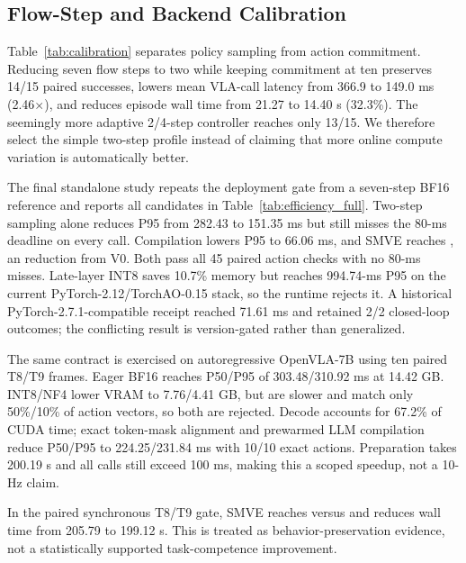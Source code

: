 \documentclass[runningheads]{waica}
\begin{document}
\subsection{Flow-Step and Backend Calibration}

Table~\ref{tab:calibration} separates policy sampling from action commitment.
Reducing seven flow steps to two while keeping commitment at ten preserves
14/15 paired successes, lowers mean VLA-call latency from 366.9 to 149.0 ms
(2.46$\times$), and reduces episode wall time from 21.27 to 14.40 s (32.3\%).
The seemingly more adaptive 2/4-step controller reaches only 13/15. We
therefore select the simple two-step profile instead of claiming that more
online compute variation is automatically better.



The final standalone study repeats the deployment gate from a seven-step BF16
reference and reports all candidates in Table~\ref{tab:efficiency_full}.
Two-step sampling alone reduces P95 from 282.43 to 151.35 ms but still misses
the 80-ms deadline on every call. Compilation lowers P95 to 66.06 ms, and SMVE
reaches \CarveFinalSmvePninetyfive{}, an \CarveFinalSmveReduction{} reduction
from V0. Both pass all 45 paired action checks with no 80-ms misses. Late-layer
INT8 saves 10.7\% memory but reaches 994.74-ms P95 on the current
PyTorch-2.12/TorchAO-0.15 stack, so the runtime rejects it. A historical
PyTorch-2.7.1-compatible receipt reached 71.61 ms and retained 2/2 closed-loop
outcomes; the conflicting result is version-gated rather than generalized.



The same contract is exercised on autoregressive OpenVLA-7B using ten paired
T8/T9 frames. Eager BF16 reaches P50/P95 of 303.48/310.92 ms at 14.42 GB.
INT8/NF4 lower VRAM to 7.76/4.41 GB, but are slower and match only 50\%/10\%
of action vectors, so both are rejected. Decode accounts for 67.2\% of CUDA
time; exact token-mask alignment and prewarmed LLM compilation reduce P50/P95
to 224.25/231.84 ms with 10/10 exact actions. Preparation takes 200.19 s and
all calls still exceed 100 ms, making this a scoped speedup, not a 10-Hz claim.

In the paired synchronous T8/T9 gate, SMVE reaches \CarveSmveSuccess{} versus
\CarveSyncEightSuccess{} and reduces wall time from 205.79 to 199.12 s. This
is treated as behavior-preservation evidence, not a statistically supported
task-competence improvement.
\end{document}
